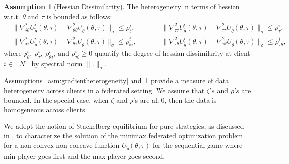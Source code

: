 \documentclass{article}
\let\cite\relax
\newcommand*{\cite}{\citep}
\theoremstyle{definition}
\newtheorem{assumption}{Assumption}%
\begin{document}
\begin{assumption}[Hessian Dissimilarity]
\label{asm:hessianheterogeneity}
    The heterogeneity in terms of hessian w.r.t. $\theta$ and $\tau$ is bounded as follows:
    \begin{align*}
   &\|\nabla_{\theta\theta}^2U_{\tilde\theta}^i(\theta,\tau)-\nabla_{\theta\theta}^2U_{\tilde\theta}(\theta,\tau)\|_{\sigma}\leq \rho_{\theta}^i,\qquad&
&\|\nabla_{\tau\tau}^2U_{\tilde\theta}^i(\theta,\tau)-\nabla_{\tau\tau}^2U_{\tilde\theta}(\theta,\tau)\|_{\sigma}\leq \rho_{\tau}^i,\\
&\|\nabla_{\theta\tau}^2U_{\tilde\theta}^i(\theta,\tau)-\nabla_{\theta\tau}^2U_{\tilde\theta}(\theta,\tau)\|_{\sigma}\leq \rho_{\theta\tau}^i,\qquad&
&\|\nabla_{\tau\theta}^2U_{\tilde\theta}^i(\theta,\tau)-\nabla_{\tau\theta}^2U_{\tilde\theta}(\theta,\tau)\|_{\sigma}\leq \rho_{\tau\theta}^i,
    \end{align*}
    where $\rho_{\theta}^i,~\rho_{\tau}^i,~ \rho_{\theta\tau}^i,~\text{and }\rho_{\tau\theta}^i\geq0$ quantify the degree of hessian dissimilarity at client $ i \in [N] $ by spectral norm $\|.\|_{\sigma}$.
\end{assumption}
Assumptions~\ref{asm:gradientheterogeneity} and~\ref{asm:hessianheterogeneity} provide a measure of data heterogeneity across clients in a federated setting. We assume that $\zeta's$ and $\rho's$ are bounded. In the special case, when $\zeta$ and $\rho$'s are all $0$, then the data is homogeneous across clients.

We adopt the notion of Stackelberg equilibrium for pure strategies, as discussed in \cite{pmlr-v119-jin20e}, to characterize the solution of the minimax federated optimization problem for a non-convex non-concave function $U_{\tilde\theta}(\theta,\tau)$ for the sequential game where min-player goes first and the max-player goes second.
\end{document}
